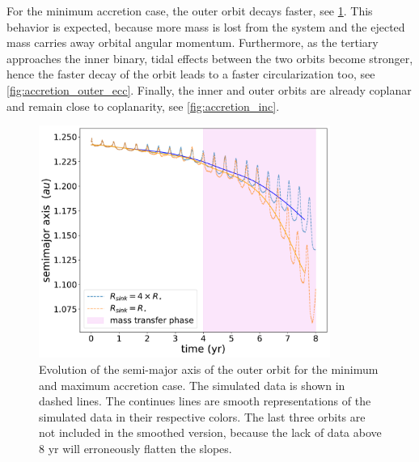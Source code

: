 For the minimum accretion case, the outer orbit decays faster, see \cref{fig:accretion_outer_semimajor_axis}. This behavior is expected, because more mass is lost from the system and the ejected mass carries away orbital angular momentum. Furthermore, as the tertiary approaches the inner binary, tidal effects between the two orbits become stronger, hence the faster decay of the orbit leads to a faster circularization too, see \cref{fig:accretion_outer_ecc}. Finally, the inner and outer orbits are already coplanar and remain close to coplanarity, see \cref{fig:accretion_inc}.
\newpage
\thispagestyle{empty}
\begin{figure}[H]
\vspace{-3cm}
    \centering
    \includegraphics[width=0.85\textwidth]{Thesis/graphs/accretion_case/accretion_outer_semimajor_axis.pdf}
    \caption{Evolution of the semi-major axis of the outer orbit for the minimum and maximum accretion case. The simulated data is shown in dashed lines. The continues lines are smooth representations of the simulated data in their respective colors. The last three orbits are not included in the smoothed version, because the lack of data above $8$ yr will erroneously flatten the slopes.}
    \label{fig:accretion_outer_semimajor_axis}
\end{figure}
